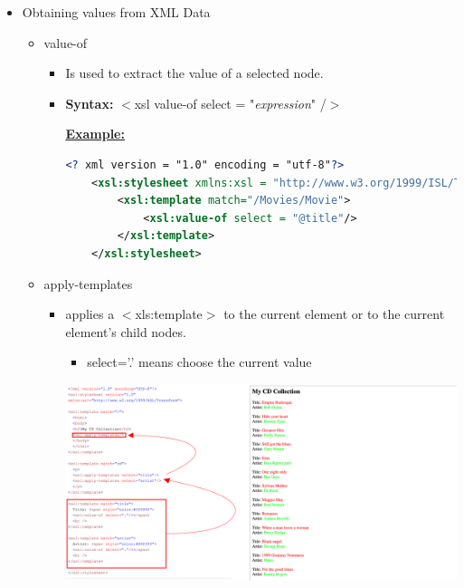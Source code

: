 \documentclass[12pt]{article}
\begin{document}
\begin{enumerate}[1.]
\begin{enumerate}[a)]
\begin{itemize}
            \item Obtaining values from XML Data
            \begin{itemize}
                \item value-of
                \begin{itemize}
                    \item Is used to extract the value of a selected node.
                    \item \textbf{Syntax:} $<$xsl value-of select = "\textit{expression}" /$>$


                    \bigskip

                    \underline{\textbf{Example:}}

    \begin{lstlisting}[language=XML]
    <? xml version = "1.0" encoding = "utf-8"?>
    <xsl:stylesheet xmlns:xsl = "http://www.w3.org/1999/ISL/Transform">
        <xsl:template match="/Movies/Movie">
            <xsl:value-of select = "@title"/>
        </xsl:template>
    </xsl:stylesheet>
    \end{lstlisting}
                \end{itemize}

                \item apply-templates
                \begin{itemize}
                    \item applies a $<$xls:template$>$ to the current element or
                    to the current element's child nodes.
                    \begin{itemize}
                        \item select='.' means choose the current value
                    \end{itemize}

                    \begin{center}
                    \includegraphics[width=\linewidth]{images/worksheet_11_solution_1.png}
                    \end{center}
                \end{itemize}


\end{itemize}
\end{itemize}
\end{enumerate}
\end{enumerate}
\end{document}
